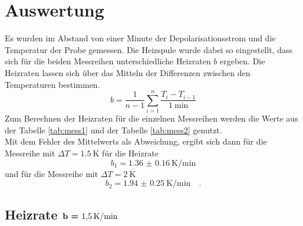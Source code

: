 \newpage 
\section{Auswertung}

\noindent Es wurden im Abstand von einer Minute der Depolarisationsstrom und die Temperatur der Probe gemessen.
Die Heizspule wurde dabei so eingestellt, dass sich für die beiden Messreihen unterschiedliche Heizraten $b$ ergeben.
Die Heizraten lassen sich über das Mitteln der Differenzen zwischen den Temperaturen bestimmen.\\
\begin{equation*}
  b = \frac{1}{n-1} \sum_{i=1}^{n} \frac{T_i - T_{i-1}}{\SI{1}{\minute}}
\end{equation*}
Zum Berechnen der Heizraten für die einzelnen Messreihen werden die Werte aus der Tabelle \ref{tab:mess1} und der Tabelle \ref{tab:mess2} genutzt.\\
Mit dem Fehler des Mittelwerts als Abweichung, ergibt sich dann für die Messreihe mit $\Delta T = \SI{1.5}{\kelvin}$ für die Heizrate
\begin{equation*}
  b_1 = \SI{1.36(016)}{\kelvin\per\minute}
\end{equation*}
und für die Messreihe mit $\Delta T = \SI{2}{\kelvin}$ 
\begin{equation*}
  b_2 = \SI{1.94(025)}{\kelvin\per\minute} \quad .
\end{equation*}

\subsection{Heizrate $\textbf{b = \SI{1.5}{\kelvin\per\minute}}$}
\label{sec:15}

